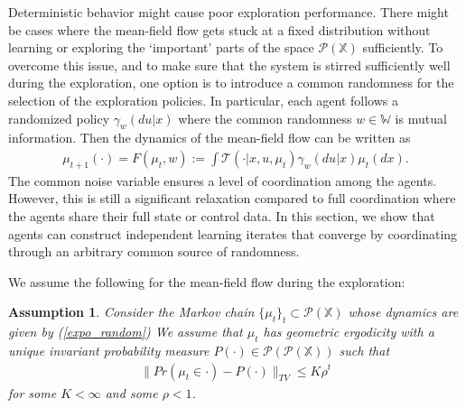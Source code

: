 \documentclass[twoside,11pt]{article}
\newtheorem{assumption}{Assumption}[section]
\def\P{{\mathcal P}}
\begin{document}
Deterministic behavior might cause poor exploration performance. There might be cases where the mean-field flow gets stuck at a fixed distribution without learning or exploring the `important' parts of the space $\P(\mathds{X})$ sufficiently. To overcome this issue, and to make sure that the system is stirred sufficiently well during the exploration, one option is to introduce a common randomness for the selection of the exploration policies. In particular, each agent follows a randomized policy $\gamma_w(du|x)$   where the common randomness $w\in\mathds{W}$ is mutual information. Then the dynamics of the mean-field flow can be written as
\begin{align}\label{expo_random}
\mu_{t+1}(\cdot)=F(\mu_t,w):= \int \mathcal{T}(\cdot|x,u,\mu_t)\gamma_w(du|x)\mu_t(dx).
\end{align}
The common noise variable ensures  a level of coordination among the agents. However, this is still a significant relaxation compared to full coordination where the agents share their full state or control data.  In this section, we show that agents can construct independent learning iterates that converge by coordinating through an arbitrary common source of randomness.


We assume the following for the mean-field flow during the exploration:
\begin{assumption}\label{exp_assmp}
Consider the Markov chain $\{\mu_t\}_t\subset \P(\mathds{X})$ whose dynamics are given by (\ref{expo_random})
We assume that $\mu_t$ has geometric ergodicity with a unique invariant probability measure $P(\cdot)\in \P(\P(\mathds{X}))$ such that 
\begin{align*}
\|Pr(\mu_t\in\cdot) - P(\cdot)\|_{TV}\leq K \rho^t
\end{align*}
for some $K<\infty$ and some $\rho<1$.
\end{assumption}
\end{document}
